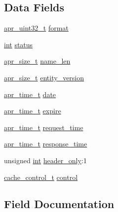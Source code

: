 \subsection*{Data Fields}
\begin{DoxyCompactItemize}
\item 
\hyperlink{group__apr__platform_ga558548a135d8a816c4787250744ea147}{apr\+\_\+uint32\+\_\+t} \hyperlink{structcache__socache__info__t_a2ac8204aaa4e9db0d7d088b72c1c4afa}{format}
\item 
\hyperlink{pcre_8txt_a42dfa4ff673c82d8efe7144098fbc198}{int} \hyperlink{structcache__socache__info__t_aaa8d9cb043949025aa3eaca6bf15a0fd}{status}
\item 
\hyperlink{group__apr__platform_gaaa72b2253f6f3032cefea5712a27540e}{apr\+\_\+size\+\_\+t} \hyperlink{structcache__socache__info__t_a00069452f6394172425a459eac2d44d6}{name\+\_\+len}
\item 
\hyperlink{group__apr__platform_gaaa72b2253f6f3032cefea5712a27540e}{apr\+\_\+size\+\_\+t} \hyperlink{structcache__socache__info__t_a8393b63d072cc8518b82ffde64359e32}{entity\+\_\+version}
\item 
\hyperlink{group__apr__time_gadb4bde16055748190eae190c55aa02bb}{apr\+\_\+time\+\_\+t} \hyperlink{structcache__socache__info__t_ad605c090b162017f97b14a830f88f8e9}{date}
\item 
\hyperlink{group__apr__time_gadb4bde16055748190eae190c55aa02bb}{apr\+\_\+time\+\_\+t} \hyperlink{structcache__socache__info__t_a8531e8db783ab18e6201983a83ce6f63}{expire}
\item 
\hyperlink{group__apr__time_gadb4bde16055748190eae190c55aa02bb}{apr\+\_\+time\+\_\+t} \hyperlink{structcache__socache__info__t_a1c789ea3a8e9d6d390ba6522f25163f5}{request\+\_\+time}
\item 
\hyperlink{group__apr__time_gadb4bde16055748190eae190c55aa02bb}{apr\+\_\+time\+\_\+t} \hyperlink{structcache__socache__info__t_aff77b1740bb5e4b2b2aa027bfd7cabf7}{response\+\_\+time}
\item 
unsigned \hyperlink{pcre_8txt_a42dfa4ff673c82d8efe7144098fbc198}{int} \hyperlink{structcache__socache__info__t_a7e970560e2c432c48ec7c6355fff5ee4}{header\+\_\+only}\+:1
\item 
\hyperlink{group__Cache__cache_ga974ed8fda97372a8db4010093bf933c2}{cache\+\_\+control\+\_\+t} \hyperlink{structcache__socache__info__t_a6d526fe1247766191633afade8ca4cf0}{control}
\end{DoxyCompactItemize}


\subsection{Field Documentation}
